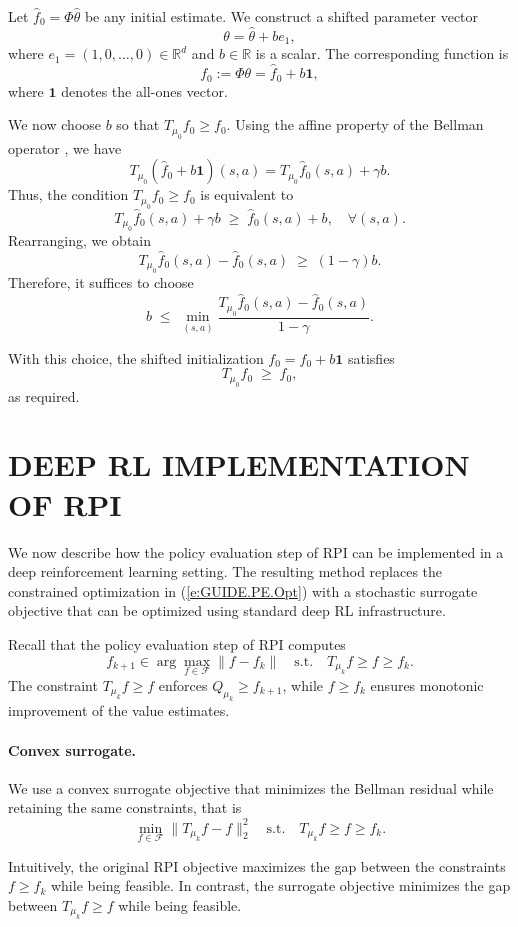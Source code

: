 \documentclass[twoside]{article}
\theoremstyle{plain}
\theoremstyle{definition}
\theoremstyle{remark}
\renewcommand{\eqref}[1]{(\ref{#1})}
\newcommand{\ones}{\mathbf{1}}
\begin{document}
Let $\hat f_0 = \Phi \hat \theta$ be any initial estimate. We construct a shifted parameter vector
\[
\theta = \hat \theta + b e_1,
\]
where $e_1 = (1,0,\ldots,0) \in \mathbb{R}^d$ and $b \in \mathbb{R}$ is a scalar. The corresponding function is
\[
f_0 := \Phi \theta = \hat f_0 + b \ones,
\]
where $\ones$ denotes the all-ones vector.

We now choose $b$ so that $T_{\mu_0} f_0 \ge f_0$. Using the affine property of the Bellman operator \citep[Lemma 2.4]{bertsekas1996neuro}, we have
\[
T_{\mu_0}(\hat f_0 + b \ones)(s,a)
= T_{\mu_0} \hat f_0(s,a) + \gamma b.
\]
Thus, the condition $T_{\mu_0} f_0 \ge f_0$ is equivalent to
\[
T_{\mu_0} \hat f_0(s,a) + \gamma b
\;\ge\;
\hat f_0(s,a) + b,
\quad \forall (s,a).
\]
Rearranging, we obtain
\[
T_{\mu_0} \hat f_0(s,a) - \hat f_0(s,a)
\;\ge\;
(1-\gamma)b.
\]
Therefore, it suffices to choose
\[
b \;\le\;
\min_{(s,a)} \frac{T_{\mu_0} \hat f_0(s,a) - \hat f_0(s,a)}{1-\gamma}.
\]

With this choice, the shifted initialization $f_0 = \hat f_0 + b \ones$ satisfies
\[
T_{\mu_0} f_0 \;\ge\; f_0,
\]
as required.


\section{DEEP RL IMPLEMENTATION OF RPI}
\label{sec:deep_rpi}

We now describe how the policy evaluation step of RPI can be implemented
in a deep reinforcement learning setting. The resulting method replaces the
constrained optimization in \eqref{e:GUIDE.PE.Opt} with a stochastic surrogate
objective that can be optimized using standard deep RL infrastructure.

Recall that the policy evaluation step of RPI computes
\[
f_{k+1} \in 
\arg\max_{f\in\mathcal F} \|f-f_k\|
\quad
\text{s.t.}
\quad
T_{\mu_k}f \ge f \ge f_k .
\]
The constraint $T_{\mu_k}f \ge f$ enforces $Q_{\mu_k} \ge f_{k+1}$, while
$f \ge f_k$ ensures monotonic improvement of the value estimates.

\paragraph{Convex surrogate.} We use a
convex surrogate objective that minimizes the Bellman residual while
retaining the same constraints, that is
\[
\min_{f\in\mathcal F} \|T_{\mu_k}f - f\|^2_2
\quad
\text{s.t.}
\quad
T_{\mu_k}f \ge f \ge f_k  .
\]

Intuitively, the original RPI objective maximizes the gap between the
constraints $f \ge f_k$ while  being feasible. In contrast, the surrogate
objective minimizes the gap between $T_{\mu_k}f \ge f$ while being feasible. 
\end{document}
